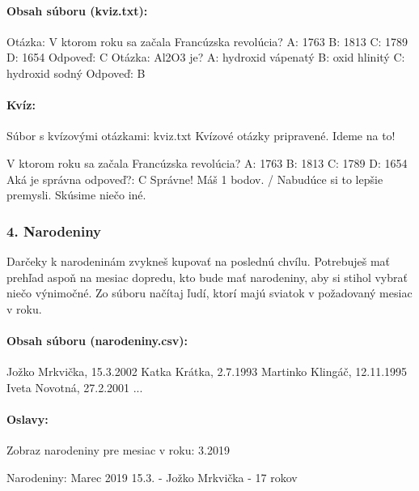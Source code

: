 \paragraph{Obsah súboru (kviz.txt):}

\begin{code}
Otázka: V ktorom roku sa začala Francúzska revolúcia?
  A: 1763
  B: 1813
  C: 1789
  D: 1654
Odpoveď: C
Otázka: Al2O3 je?
  A: hydroxid vápenatý
  B: oxid hlinitý
  C: hydroxid sodný
Odpoveď: B
\end{code}

\paragraph{Kvíz:}

\begin{code}
Súbor s kvízovými otázkami: kviz.txt
Kvízové otázky pripravené.
Ideme na to!

V ktorom roku sa začala Francúzska revolúcia?
A: 1763
B: 1813
C: 1789
D: 1654
Aká je správna odpoveď?: C
Správne! Máš 1 bodov. / Nabudúce si to lepšie premysli. Skúsime niečo iné.
\end{code}


\subsubsection*{4. Narodeniny}
Darčeky k narodeninám zvykneš kupovať na poslednú chvílu. Potrebuješ mať prehľad aspoň na mesiac dopredu, kto bude mať narodeniny, aby si stihol vybrať niečo výnimočné. Zo súboru načítaj ľudí, ktorí majú sviatok v požadovaný mesiac v roku.

\paragraph{Obsah súboru (narodeniny.csv):}

\begin{code}
Jožko Mrkvička, 15.3.2002
Katka Krátka, 2.7.1993
Martinko Klingáč, 12.11.1995
Iveta Novotná, 27.2.2001
...
\end{code}

\paragraph{Oslavy:}

\begin{code}
Zobraz narodeniny pre mesiac v roku: 3.2019

Narodeniny: Marec 2019
15.3. - Jožko Mrkvička - 17 rokov
\end{code}


